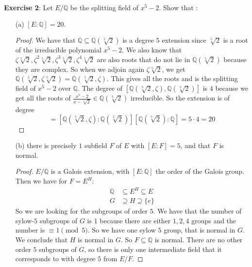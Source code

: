 \documentclass{article}
\begin{document}
\textbf{Exercise 2}: Let $E/\mathbb{Q}$ be the splitting field of $x^{5} - 2$. Show that :
    \begin{itemize}
        \item [(a)] $[E : \mathbb{Q}] = 20$.
            \begin{proof}
                We have that $ \mathbb{Q} \subseteq \mathbb{ Q}(\sqrt[5]{2})$ is a degree $5$ extension since $\sqrt[5]{2}$ is a root of the irreducible polynomial $x^{5} - 2$. We also know that $\zeta \sqrt[5]{2}, \zeta^{ 2} \sqrt[5]{2}, \zeta^{ 3}\sqrt[5]{2}, \zeta^{ 4}\sqrt[5]{2}$ are also roots that do not lie in $\mathbb{Q}(\sqrt[5]{2})$ because they are complex. So when we adjoin again $\zeta \sqrt[5]{2}$, we get $\mathbb{Q}(\sqrt[5]{2}, \zeta \sqrt[5]{2}) = \mathbb{Q}(\sqrt[5]{2}, \zeta)$. This gives all the roots and is the splitting field of $x^{5} - 2$ over $\mathbb{Q}$. The degree of $[\mathbb{Q}(\sqrt[5]{2}, \zeta), \mathbb{ Q}(\sqrt[5]{2})]$ is $4$ because we get all the roots of $\frac{x^{5} - 2}{x - \sqrt[5]{2}} \in \mathbb{ Q}(\sqrt[5]{2})$ irreducible. So the extension is of degree
                    \begin{equation*}
                        [E : \mathbb{Q}] = [\mathbb{Q}(\sqrt[5]{2}, \zeta) : \mathbb{Q}(\sqrt[5]{2})][\mathbb{Q}(\sqrt[5]{2}) : \mathbb{Q}] = 5 \cdot 4 = 20
                    \end{equation*}
            \end{proof}

        \item [(b)] there is precisely $1$ subfield $F$ of $E$ with $[E : F] = 5$, and that $F$ is normal.
            \begin{proof}
                $E/\mathbb{Q}$ is a Galois extension, with $[E : \mathbb{Q}]$ the order of the Galois group. Then we have for $F = E^{H}$:
                    \begin{align*}
                        \mathbb{Q} &\subseteq  E^{H} \subseteq E \\
                        G          &\supseteq H \supseteq \{ e\}   
                    \end{align*}
                So we are looking for the subgroups of order $5$. We have that the number of sylow-$5$ subgroups of $G$ is $1$ because there are either $1, 2, 4$ groups and the number is $\equiv 1\pmod{ 5}$. So we have one sylow $5$ group, that is normal in $G$. We conclude that $H$ is normal in $G$. So $F \subseteq \mathbb{Q}$ is normal. There are no other order $5$ subgroups of $G$, so there is only one intermediate field that it corresponds to with degree $5$ from $E/F$.
            \end{proof}


\end{itemize}
\end{document}

